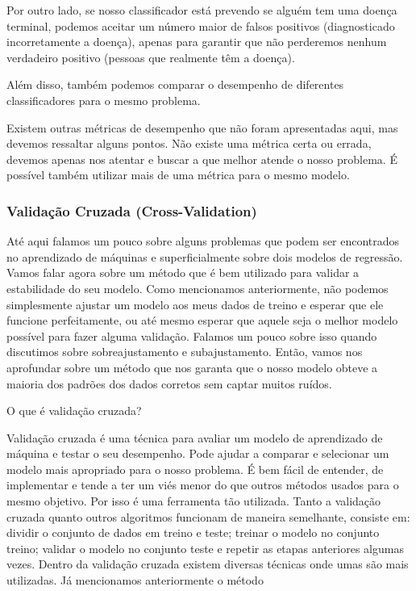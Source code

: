 \documentclass[
  letterpaper,
  DIV=11,
  numbers=noendperiod]{scrreprt}
\begin{document}
Por outro lado, se nosso classificador está prevendo se alguém tem uma
doença terminal, podemos aceitar um número maior de falsos positivos
(diagnosticado incorretamente a doença), apenas para garantir que não
perderemos nenhum verdadeiro positivo (pessoas que realmente têm a
doença).

Além disso, também podemos comparar o desempenho de diferentes
classificadores para o mesmo problema.

Existem outras métricas de desempenho que não foram apresentadas aqui,
mas devemos ressaltar alguns pontos. Não existe uma métrica certa ou
errada, devemos apenas nos atentar e buscar a que melhor atende o nosso
problema. É possível também utilizar mais de uma métrica para o mesmo
modelo.

\hypertarget{validauxe7uxe3o-cruzada-cross-validation}{%
\subsubsection{Validação Cruzada
(Cross-Validation)}\label{validauxe7uxe3o-cruzada-cross-validation}}

Até aqui falamos um pouco sobre alguns problemas que podem ser
encontrados no aprendizado de máquinas e superficialmente sobre dois
modelos de regressão. Vamos falar agora sobre um método que é bem
utilizado para validar a estabilidade do seu modelo. Como mencionamos
anteriormente, não podemos simplesmente ajustar um modelo aos meus dados
de treino e esperar que ele funcione perfeitamente, ou até mesmo esperar
que aquele seja o melhor modelo possível para fazer alguma validação.
Falamos um pouco sobre isso quando discutimos sobre sobreajustamento e
subajustamento. Então, vamos nos aprofundar sobre um método que nos
garanta que o nosso modelo obteve a maioria dos padrões dos dados
corretos sem captar muitos ruídos.

O que é validação cruzada?

Validação cruzada é uma técnica para avaliar um modelo de aprendizado de
máquina e testar o seu desempenho. Pode ajudar a comparar e selecionar
um modelo mais apropriado para o nosso problema. É bem fácil de
entender, de implementar e tende a ter um viés menor do que outros
métodos usados para o mesmo objetivo. Por isso é uma ferramenta tão
utilizada. Tanto a validação cruzada quanto outros algoritmos funcionam
de maneira semelhante, consiste em: dividir o conjunto de dados em
treino e teste; treinar o modelo no conjunto treino; validar o modelo no
conjunto teste e repetir as etapas anteriores algumas vezes. Dentro da
validação cruzada existem diversas técnicas onde umas são mais
utilizadas. Já mencionamos anteriormente o método
\end{document}
